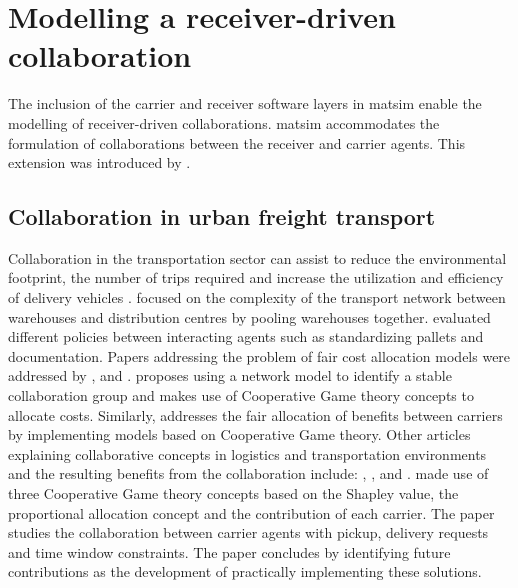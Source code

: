 \section{Modelling a receiver-driven collaboration}

The inclusion of the carrier and receiver software layers in \acrshort{matsim} enable the modelling of receiver-driven collaborations. \acrshort{matsim} accommodates the formulation of collaborations between the receiver and carrier agents. This extension was introduced by \citet{bean2020behavioural}. 

\subsection{Collaboration in urban freight transport}
Collaboration in the transportation sector can assist to reduce the environmental footprint, the number of trips required and increase the utilization and efficiency of delivery vehicles \citep{perez2015horizontal}. \citet{ballot2010reducing} focused on the complexity of the transport network between warehouses and distribution centres by pooling warehouses together. \citet{caputo1996internal} evaluated different policies between interacting agents such as standardizing pallets and documentation. Papers addressing the problem of fair cost allocation models were addressed by \citet{audy2012empirical}, \citet{houghtalen2007designing} and \citet{dai2012profit}. \citet{audy2012empirical} proposes using a network model to identify a stable collaboration group and makes use of Cooperative Game theory concepts to allocate costs. Similarly, \citet{houghtalen2007designing} addresses the fair allocation of benefits between carriers by implementing models based on Cooperative Game theory. Other articles explaining collaborative concepts in logistics and transportation environments and the resulting benefits from the collaboration include: \citet{janjevic2018investigating}, \citet{gonzalez2012defining}, \citet{lozano2013cooperative} and \citet{lindawati2014collaboration}. \citet{dai2012profit} made use of three Cooperative Game theory concepts based on the Shapley value, the proportional allocation concept and the contribution of each carrier. The paper studies the collaboration between carrier agents with pickup, delivery requests and time window constraints. The paper concludes by identifying future contributions as the development of practically implementing these solutions. \par


